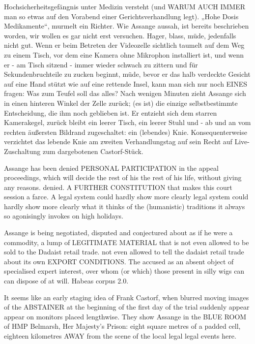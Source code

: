 \begin{multicols}{2}
{Hochsicherheitsgefängnis unter Medizin versteht (und
WARUM AUCH IMMER man so etwas auf den Vorabend
einer Gerichtsverhandlung legt). „Hohe Dosis Medikamente“, murmelt ein Richter. Wie Assange aussah, ist
bereits beschrieben worden, wir wollen es gar nicht erst
versuchen. Hager, blass, müde, jedenfalls nicht gut.
\textCR
Wenn er beim Betreten der Videozelle sichtlich taumelt auf dem Weg zu einem Tisch, vor dem eine Kamera ohne
Mikrophon installiert ist, und wenn er - am Tisch sitzend
- immer wieder schwach zu zittern und für Sekundenbruchteile zu zucken beginnt, müde, bevor er das halb
verdeckte Gesicht auf eine Hand stützt wie auf eine rettende Insel, kann man sich nur noch EINES fragen: Was
zum Teufel soll das alles?
\textCR
Nach wenigen Minuten zieht Assange sich in einen hinteren Winkel der Zelle zurück; (es ist) die einzige selbstbestimmte Entscheidung, die ihm noch geblieben ist. Er
entzieht sich dem starren Kamerakegel, zurück bleibt
ein leerer Tisch, ein leerer Stuhl und - ab und an vom
rechten äußersten Bildrand zugeschaltet: ein (lebendes)
Knie.
\textCR
Konsequenterweise verzichtet das lebende Knie am
zweiten Verhandlungstag auf sein Recht auf Live-Zuschaltung zum dargebotenen Castorf-Stück.}


Assange has been denied PERSONAL PARTICIPATION in the
appeal proceedings, which will decide the rest of his
the rest of his life, without giving any reasons.
denied. A FURTHER CONSTITUTION that makes this court session a farce. A legal system could hardly show more clearly
legal system could hardly show more clearly what it thinks of the (humanistic) traditions it always so agonisingly invokes on high holidays.

Assange is being negotiated, disputed and conjectured about as if he were a commodity, a lump of LEGITIMATE MATERIAL that is not even allowed to be sold to the Dadaist retail trade.
not even allowed to tell the dadaist retail trade about its own
EXPORT CONDITIONS. The accused
as an absent object of specialised expert interest,
over whom (or which) those present in silly wigs can
can dispose of at will. Habeas corpus 2.0.

It seems like an early staging idea of Frank
Castorf, when blurred moving images of the ABSTAINER at the beginning of the first day of the trial suddenly appear
appear on monitors placed lengthwise. They
show Assange in the BLUE ROOM of HMP Belmarsh, Her
Majesty's Prison: eight square metres of a padded cell,
eighteen kilometres AWAY from the scene of the local legal
legal events here.


\end{multicols}
